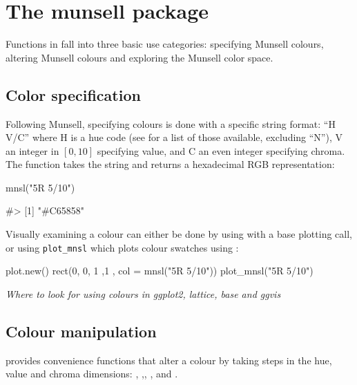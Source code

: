 \section{The munsell package}\label{the-munsell-package}

Functions in  fall into three basic use categories:
specifying Munsell colours, altering Munsell colours and exploring the
Munsell color space.

\subsection{Color specification}\label{color-specification}

Following Munsell, specifying colours is done with a specific string
format: ``H V/C'' where H is a hue code (see  for a
list of those available, excluding ``N''), V an integer in \([0, 10]\)
specifying value, and C an even integer specifying chroma. The
 function takes the string and returns a hexadecimal RGB
representation:

\begin{Schunk}
\begin{Sinput}
mnsl("5R 5/10")
\end{Sinput}
\begin{Soutput}
#> [1] "#C65858"
\end{Soutput}
\end{Schunk}

Visually examining a colour can either be done by using  with
a base plotting call, or using \texttt{plot\_mnsl} which plots colour
swatches using :

\begin{Schunk}
\begin{Sinput}
plot.new()
rect(0, 0, 1 ,1 , col = mnsl("5R 5/10"))
plot_mnsl("5R 5/10")
\end{Sinput}
\end{Schunk}

\emph{Where to look for using colours in ggplot2, lattice, base and
ggvis}

\subsection{Colour manipulation}\label{colour-manipulation}

 provides convenience functions that alter a colour by
taking steps in the hue, value and chroma dimensions: ,
,, ,  and
.\\

